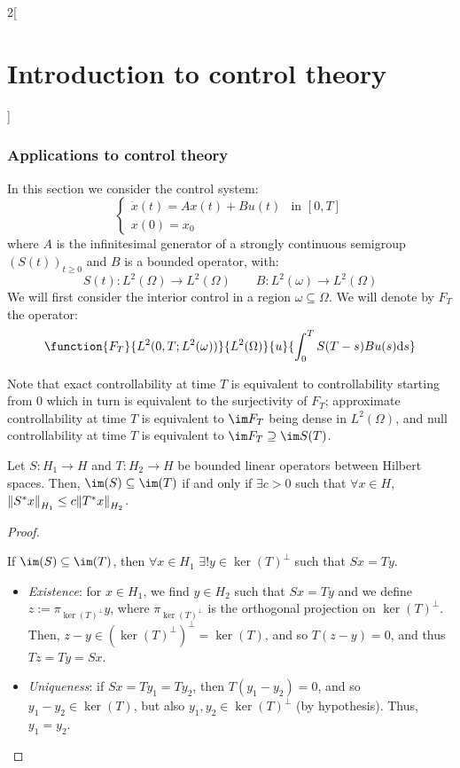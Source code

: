 \documentclass[../../../main_math.tex]{subfiles}
\begin{document}
\begin{multicols}{2}[\section{Introduction to control theory}]
  \subsubsection{Applications to control theory}
  In this section we consider the control system:
  \begin{equation}\label{ICT:control_system}
    \begin{cases}
      \dot{x}(t)=Ax(t)+Bu(t) & \text{in } [0,T] \\
      x(0)=x_0
    \end{cases}
  \end{equation}
  where $A$ is the infinitesimal generator of a strongly continuous semigroup $(S(t))_{t\geq 0}$ and $B$ is a bounded operator, with:
  $$
    S(t):L^2(\Omega)\to L^2(\Omega)\qquad B:L^2(\omega)\to L^2(\Omega)
  $$
  We will first consider the interior control in a region $\omega\subseteq \Omega$. We will denote by $F_T$ the operator:
  $$
    \function{F_T}{L^2(0,T;L^2(\omega))}{L^2(\Omega)}{u}{\int_0^T S(T-s)Bu(s)\dd s}
  $$
  \begin{remark}
    Note that exact controllability at time $T$ is equivalent to controllability starting from 0 which in turn is equivalent to the surjectivity of $F_T$; approximate controllability at time $T$ is equivalent to $\im F_T$ being dense in $L^2(\Omega)$, and null controllability at time $T$ is equivalent to $\im F_T\supseteq \im S(T)$.
  \end{remark}
  \begin{theorem}\label{ICT:controltheorem}
    Let $S:H_1\to H$ and $T:H_2\to H$ be bounded linear operators between Hilbert spaces. Then, $\im(S)\subseteq \im(T)$ if and only if $\exists c>0$ such that $\forall x\in H$, $\norm{S^*x}_{H_1}\leq c\norm{T^*x}_{H_2}$.
  \end{theorem}
  \begin{proof}
    \begin{itemizeiff}
      If $\im(S)\subseteq \im(T)$, then $\forall x\in H_1$ $\exists! y\in \ker(T)^\perp$ such that $Sx=Ty$.
      \begin{itemize}
        \item \textit{Existence}: for $x\in H_1$, we find $y\in H_2$ such that $Sx=Ty$ and we define $z:=\pi_{\ker(T)^\perp}y$, where $\pi_{\ker(T)^\perp}$ is the orthogonal projection on $\ker(T)^\perp$. Then, $z-y\in (\ker(T)^\perp)^\perp=\ker(T)$, and so $T(z-y)=0$, and thus $Tz=Ty=Sx$.
        \item \textit{Uniqueness}: if $Sx=Ty_1=Ty_2$, then $T(y_1-y_2)=0$, and so $y_1-y_2\in \ker(T)$, but also $y_1,y_2\in \ker(T)^\perp$ (by hypothesis). Thus, $y_1=y_2$.

\end{itemize}
\end{itemizeiff}
\end{proof}
\end{multicols}
\end{document}
